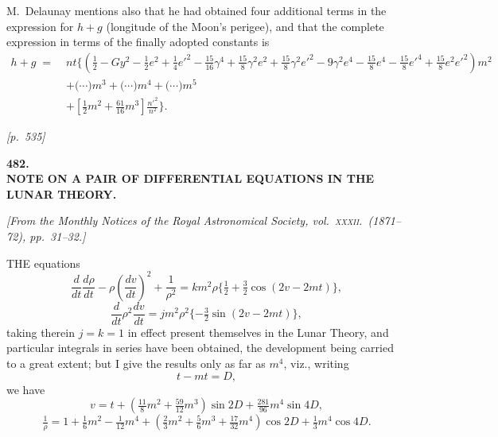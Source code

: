 \documentclass[11pt]{article}
\begin{document}
\medskip

M.~Delaunay mentions also that he had obtained four additional terms in
the expression for $h+g$ (longitude of the Moon's perigee), and that the
complete expression in terms of the finally adopted constants is
\[
\begin{aligned}
h+g\;=\;&nt\Big\{(\tfrac{1}{2}-Gy^2-\tfrac{1}{2}e^2+\tfrac{1}{4}e'^2-\tfrac{15}{16}\gamma^4+\tfrac{15}{8}\gamma^2 e^2+\tfrac{15}{8}\gamma^2 e'^2-9\gamma^2 e^4-\tfrac{15}{8}e^4-\tfrac{15}{8}e'^4+\tfrac{15}{8}e^2 e'^2)m^2\\
&+\bigl(\cdots\bigr)m^3+\bigl(\cdots\bigr)m^4+\bigl(\cdots\bigr)m^5\\
&+[\tfrac{1}{2}m^2+\tfrac{61}{16}m^3]\tfrac{n'^2}{n^2}\Big\}.
\end{aligned}
\]

\smallskip

\noindent[Observe that $h+g$ is $=nt-l$, and compare with the expression
for $l$, \textit{ante} p.~532.]


\newpage
\noindent\textit{[p.~535]}

\bigskip

\begin{center}
\textbf{\large 482.}\\[6pt]
\textbf{\Large NOTE ON A PAIR OF DIFFERENTIAL EQUATIONS IN THE}\\
\textbf{\Large LUNAR THEORY.}
\end{center}

\medskip

\noindent\textit{[From the Monthly Notices of the Royal Astronomical
Society, vol.~\textsc{xxxii}.\ (1871--72), pp.~31--32.]}

\bigskip

THE equations
\[
\frac{d}{dt}\frac{d\rho}{dt}-\rho\left(\frac{dv}{dt}\right)^2+\frac{1}{\rho^2}=km^2\rho\{\tfrac{1}{2}+\tfrac{3}{2}\cos(2v-2mt)\},
\]
\[
\frac{d}{dt}\rho^2\frac{dv}{dt}=jm^2\rho^2\{-\tfrac{3}{2}\sin(2v-2mt)\},
\]
taking therein $j=k=1$ in effect present themselves in the Lunar
Theory, and particular integrals in series have been obtained, the
development being carried to a great extent; but I give the results only
as far as $m^4$, viz., writing
\[
t-mt=D,
\]
we have
\[
v=t+(\tfrac{11}{8}m^2+\tfrac{59}{12}m^3)\sin 2D+\tfrac{281}{96}m^4\sin 4D,
\]
\[
\tfrac{1}{\rho}=1+\tfrac{1}{6}m^2-\tfrac{1}{12}m^4+(\tfrac{2}{3}m^2+\tfrac{5}{6}m^3+\tfrac{17}{32}m^4)\cos 2D+\tfrac{1}{3}m^4\cos 4D.
\]
\end{document}
